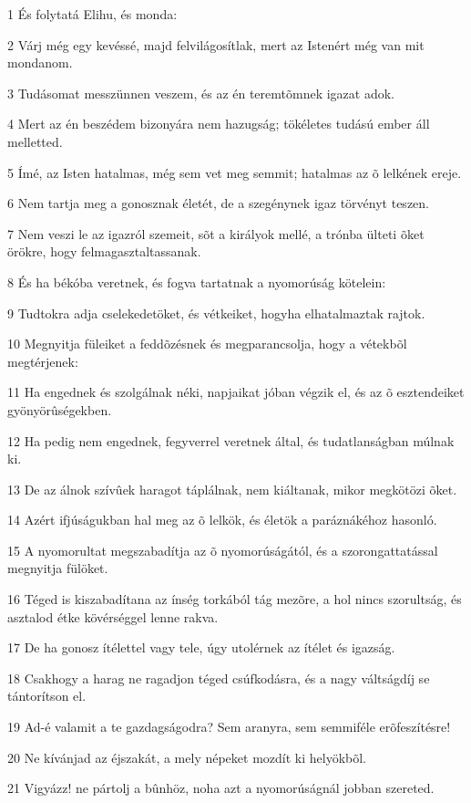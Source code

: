 \par 1 És folytatá Elihu, és monda:
\par 2 Várj még egy kevéssé, majd felvilágosítlak, mert az Istenért még van mit mondanom.
\par 3 Tudásomat messzünnen veszem, és az én teremtõmnek igazat adok.
\par 4 Mert az én beszédem bizonyára nem hazugság; tökéletes tudású ember áll melletted.
\par 5 Ímé, az Isten hatalmas, még sem vet meg semmit; hatalmas az õ lelkének ereje.
\par 6 Nem tartja meg a gonosznak életét, de a szegénynek igaz törvényt teszen.
\par 7 Nem veszi le az igazról szemeit, sõt a királyok mellé, a trónba ülteti õket örökre, hogy felmagasztaltassanak.
\par 8 És ha békóba veretnek, és fogva tartatnak a nyomorúság kötelein:
\par 9 Tudtokra adja cselekedetöket, és vétkeiket, hogyha elhatalmaztak rajtok.
\par 10 Megnyitja füleiket a feddõzésnek és megparancsolja, hogy a vétekbõl megtérjenek:
\par 11 Ha engednek és szolgálnak néki, napjaikat jóban végzik el, és az õ esztendeiket gyönyörûségekben.
\par 12 Ha pedig nem engednek, fegyverrel veretnek által, és tudatlanságban múlnak ki.
\par 13 De az álnok szívûek haragot táplálnak, nem kiáltanak, mikor megkötözi õket.
\par 14 Azért ifjúságukban hal meg az õ lelkök, és életök a paráznákéhoz hasonló.
\par 15 A nyomorultat megszabadítja az õ nyomorúságától, és a szorongattatással megnyitja fülöket.
\par 16 Téged is kiszabadítana az ínség torkából tág mezõre, a hol nincs szorultság, és asztalod étke kövérséggel lenne rakva.
\par 17 De ha gonosz ítélettel vagy tele, úgy utolérnek az ítélet és igazság.
\par 18 Csakhogy a harag ne ragadjon téged csúfkodásra, és a nagy váltságdíj se tántorítson el.
\par 19 Ad-é valamit a te gazdagságodra? Sem aranyra, sem semmiféle erõfeszítésre!
\par 20 Ne kívánjad az éjszakát, a mely népeket mozdít ki helyökbõl.
\par 21 Vigyázz! ne pártolj a bûnhöz, noha azt a nyomorúságnál jobban szereted.
